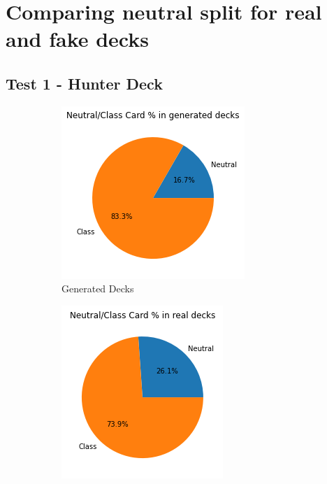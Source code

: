 \documentclass{report} %
\begin{document}
\section{Comparing neutral split for real and fake decks}
\subsection{Test 1 - Hunter Deck}
\begin{figure}[H]
\centering
\begin{subfigure}{.3\textwidth}
  \centering
  \includegraphics[width=.75\linewidth]{TestImages/NeutralSplitHunterDecks}
  \caption{Generated Decks}
\end{subfigure}%
\begin{subfigure}{.3\textwidth}
  \centering
  \includegraphics[width=.75\linewidth]{TestImages/NeutralSplitHunterDecksReal}

\end{subfigure}
\end{figure}
\end{document}
